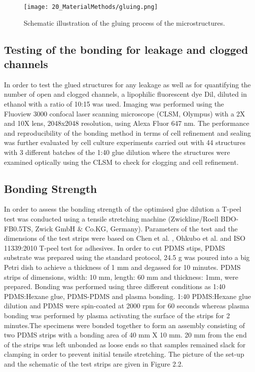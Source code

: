 \documentclass{book}
\begin{document}
\begin{figure}[H]
\centering
\texttt{[image: 20\_MaterialMethods/gluing.png]}
\caption{Schematic illustration of the gluing process of the microstructures.}
\label{fig:gluing}
\end{figure}

\subsection{Testing of the bonding for leakage and clogged channels}
In order to test the glued structures for any leakage as well as for quantifying the number of open and clogged channels, a lipophilic fluorescent dye Dil, diluted in ethanol with a ratio of 10:15 was used. Imaging was performed using the Fluoview 3000 confocal laser scanning microscope (CLSM, Olympus) with a 2X and 10X lens, 2048x2048 resolution, using Alexa Fluor 647 nm. The performance and reproducibility of the bonding method in terms of cell refinement and sealing was further evaluated by cell culture experiments carried out with 44 structures with 3 different batches of the 1:40 glue dilution where the structures were examined optically using the CLSM to check for clogging and cell refinement. 

\subsection{Bonding Strength} 
In order to assess the bonding strength of the optimised glue dilution a T-peel test was conducted using a tensile stretching machine (Zwickline/Roell BDO-FB0.5TS, Zwick GmbH $\&$ Co.KG, Germany). Parameters of the test and the dimensions of the test strips were based on Chen et al. \cite{chen2018characterization}, Ohkubo et al. \cite{ohkubo2018adhesive} and ISO 11339:2010 T-peel test for adhesives. In order to cut PDMS stips, PDMS substrate was prepared  using the standard protocol, 24.5 g was poured into a big Petri dish to achieve a thickness of 1 mm and degassed for 10 minutes. PDMS strips of dimensions, width: 10 mm, length: 60 mm and thickness: 1mm, were prepared. Bonding was performed using three different conditions as 1:40 PDMS:Hexane glue, PDMS-PDMS and plasma bonding. 1:40 PDMS:Hexane glue dilution and PDMS were spin-coated at 2000 rpm for 60 seconds whereas plasma bonding was performed by plasma activating the surface of the strips for 2 minutes.The specimens were bonded together to form an assembly consisting of two PDMS strips with a bonding area of 40 mm X 10 mm. 20 mm from the end of the strips was left unbonded as loose ends so that samples remained slack for clamping in order to prevent initial tensile stretching. The picture of the set-up and the schematic of the test strips are given in Figure 2.2.
\end{document}
